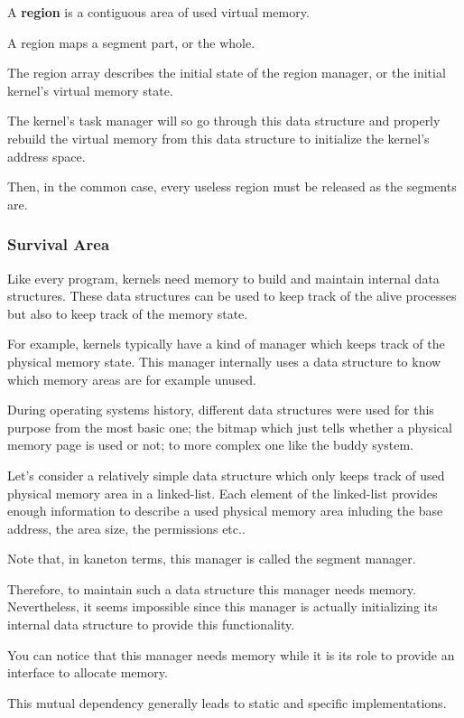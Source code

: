 A \textbf{region} is a contiguous area of used virtual memory.

A region maps a segment part, or the whole.

The region array describes the initial state of the region manager, or
the initial kernel's virtual memory state.

The kernel's task manager will so go through this data structure
and properly rebuild the virtual memory from this data structure to
initialize the kernel's address space.

Then, in the common case, every useless region must be released as the
segments are.

\subsubsection{Survival Area}

Like every program, kernels need memory to build and maintain internal
data structures. These data structures can be used to keep track of
the alive processes but also to keep track of the memory state.

For example, kernels typically have a kind of manager which keeps track
of the physical memory state. This manager internally uses a data
structure to know which memory areas are for example unused.

During operating systems history, different data structures were used for
this purpose from the most basic one; the bitmap which just tells whether
a physical memory page is used or not; to more complex one like the buddy
system.

Let's consider a relatively simple data structure which only keeps track
of used physical memory area in a linked-list. Each element of the
linked-list provides enough information to describe a used physical memory
area inluding the base address, the area size, the permissions etc..

Note that, in kaneton terms, this manager is called the segment manager.

Therefore, to maintain such a data structure this manager needs memory.
Nevertheless, it seems impossible since this manager is actually initializing
its internal data structure to provide this functionality.

You can notice that this manager needs memory while it is its role to provide
an interface to allocate memory.

This mutual dependency generally leads to static and specific implementations.

